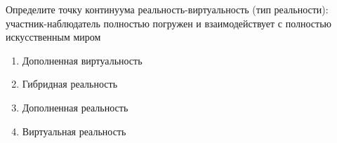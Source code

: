 
Определите точку континуума реальность-виртуальность (тип реальности): \linebreak участник-наблюдатель полностью погружен и взаимодействует с полностью искусственным миром

\begin{enumerate}
    \item Дополненная виртуальность
    \item Гибридная реальность
    \item Дополненная реальность
    \item Виртуальная реальность
\end{enumerate}

